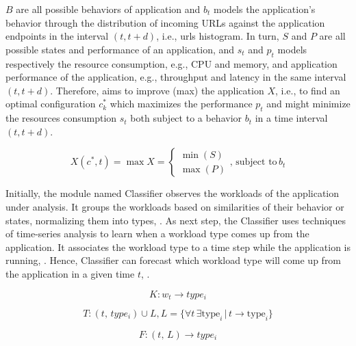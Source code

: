 $B$ are all possible behaviors of application and $b_t$ models the application's
behavior through the distribution of incoming URLs against the application
endpoints in the interval $(t, t+d)$, i.e., urls histogram. In turn, $S$ and $P$
are all possible states and performance of an application, and $s_t$ and $p_t$
models respectively the resource consumption, e.g., CPU and memory, and
application performance of the application, e.g., throughput and latency in the
same interval $(t, t+d)$. Therefore, \name aims to improve (max) the application
$X$, i.e., to find an optimal configuration $c^{*}_{k}$ which maximizes the
performance $p_t$ and might minimize the resources consumption $s_t$ both
subject to a behavior $b_t$ in a time interval $(t, t+d)$. 

\begin{equation}
  X(c^{*}, t) = \max{X} =
  \begin{cases}
    \min(S) \\
    \max(P)
  \end{cases},\, \text{subject to}\, b_t
  \label{eq:optimization}
\end{equation}

Initially, the module named Classifier observes the workloads of the application
under analysis. It groups the workloads based on similarities of their behavior
or states, normalizing them into types, . As next step, the
Classifier uses techniques of time-series analysis to learn when a workload type
comes up from the application. It associates the workload type to a time step
while the application is running, .  Hence, Classifier can
forecast which workload type will come up from the application in a given time
$t$, .

\begin{equation}
  K: w_t \rightarrow type_i
  \label{eq:classify}
\end{equation}

\begin{equation}
  T: (t,\, type_i) \cup L, L = \{ \forall t\,\exists \text{type}_i\, |\, t \rightarrow \text{type}_i \}
  \label{eq:training}
\end{equation}

\begin{equation}
  F: (t, \, L) \rightarrow type_i
  \label{eq:forecast}
\end{equation}

